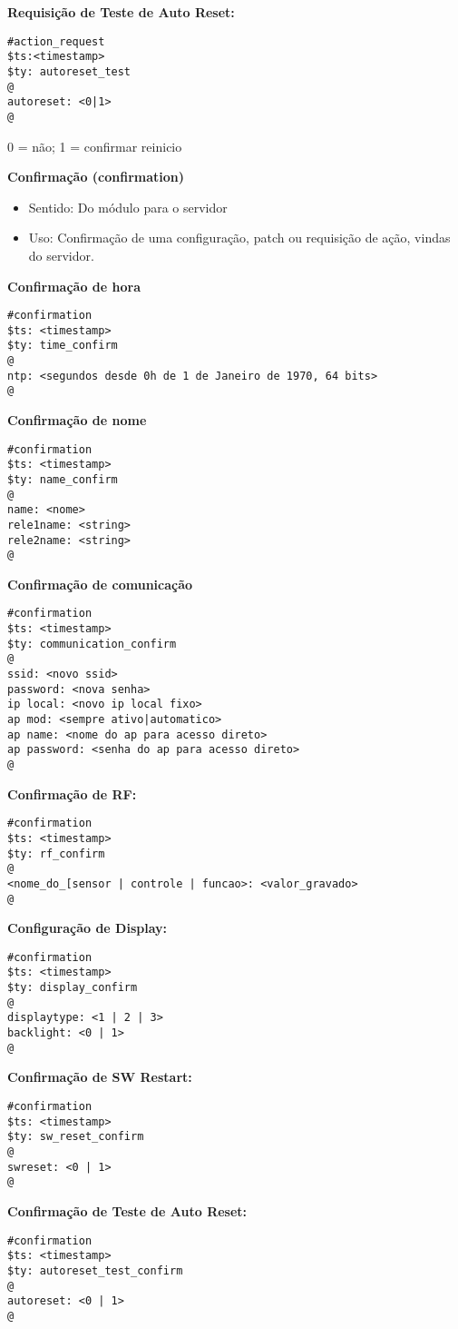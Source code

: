 \textbf{Requisição de Teste de Auto Reset:}
\begin{lstlisting}
#action_request
$ts:<timestamp>
$ty: autoreset_test
@
autoreset: <0|1>
@
\end{lstlisting}
0 = não; 1 = confirmar reinicio

\textbf{Confirmação (confirmation)}
\begin{itemize}
\item Sentido: Do módulo para o servidor
\item Uso: Confirmação de uma configuração, patch ou requisição de ação, vindas do servidor.
\end{itemize}

\textbf{Confirmação de hora}
\begin{lstlisting}
#confirmation
$ts: <timestamp>
$ty: time_confirm
@
ntp: <segundos desde 0h de 1 de Janeiro de 1970, 64 bits>
@
\end{lstlisting}

\textbf{Confirmação de nome}
\begin{lstlisting}
#confirmation
$ts: <timestamp>
$ty: name_confirm
@
name: <nome>
rele1name: <string>
rele2name: <string>
@
\end{lstlisting}

\textbf{Confirmação de comunicação}
\begin{lstlisting}
#confirmation
$ts: <timestamp>
$ty: communication_confirm
@
ssid: <novo ssid>
password: <nova senha>
ip local: <novo ip local fixo>
ap mod: <sempre ativo|automatico>
ap name: <nome do ap para acesso direto>
ap password: <senha do ap para acesso direto>
@
\end{lstlisting}

\textbf{Confirmação de RF:}
\begin{lstlisting}
#confirmation
$ts: <timestamp>
$ty: rf_confirm
@
<nome_do_[sensor | controle | funcao>: <valor_gravado>
@
\end{lstlisting}

\textbf{Configuração de Display:}
\begin{lstlisting}
#confirmation
$ts: <timestamp>
$ty: display_confirm
@
displaytype: <1 | 2 | 3>
backlight: <0 | 1>
@
\end{lstlisting}

\textbf{Confirmação de SW Restart:}
\begin{lstlisting}
#confirmation
$ts: <timestamp>
$ty: sw_reset_confirm
@
swreset: <0 | 1>
@
\end{lstlisting}

\textbf{Confirmação de Teste de Auto Reset:}
\begin{lstlisting}
#confirmation
$ts: <timestamp>
$ty: autoreset_test_confirm
@
autoreset: <0 | 1>
@
\end{lstlisting}

